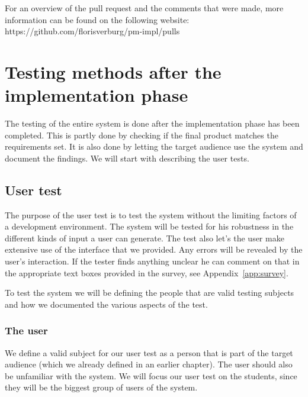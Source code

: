 For an overview of the pull request and the comments that were made, more information can be found on the following website:
https://github.com/florisverburg/pm-impl/pulls

\section{Testing methods after the implementation phase}
The testing of the entire system is done after the implementation phase has been completed.
This is partly done by checking if the final product matches the requirements set.
It is also done by letting the target audience use the system and document the findings.
We will start with describing the user tests.

\subsection{User test}
The purpose of the user test is to test the system without the limiting factors of a development environment.
The system will be tested for his robustness in the different kinds of input a user can generate.
The test also let's the user make extensive use of the interface that we provided.
Any errors will be revealed by the user's interaction.
If the tester finds anything unclear he can comment on that in the appropriate text boxes provided in the survey, see Appendix~\ref{app:survey}.

To test the system we will be defining the people that are valid testing subjects and how we documented the various aspects of the test.

\subsubsection{The user}
We define a valid subject for our user test as a person that is part of the target audience (which we already defined in an earlier chapter).
The user should also be unfamiliar with the system.
We will focus our user test on the students, since they will be the biggest group of users of the system.

